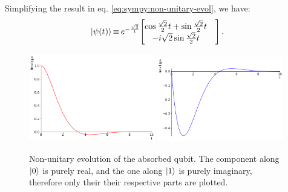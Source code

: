 Simplifying the result in eq. \eqref{eq:sympy:non-unitary-evol}, we have:
\begin{equation}
  \ket{\psi(t)} \repr e^{-\frac{\sqrt{2}}{t}} \mqty[
    \cos{\frac{\sqrt{2}}{2}t} + \sin{\frac{\sqrt{2}}{2}t}& \\
                     -i\sqrt{2} \sin{\frac{\sqrt{2}}{2}t}&
  ] \,\text{.}
\end{equation}

\begin{figure}
  \centering
  \includegraphics[width=0.49\textwidth]{img/2ldetect/re_psi0_t.png}
  \includegraphics[width=0.49\textwidth]{img/2ldetect/im_psi1_t.png}
  \caption{
    Non-unitary evolution of the absorbed qubit.
    The component along $\ket{0}$ is purely real,
    and the one along $\ket{1}$ is purely imaginary,
    therefore only their their respective parts are plotted.
  }
  \label{fig:absorbed-qubit-components}
\end{figure}

